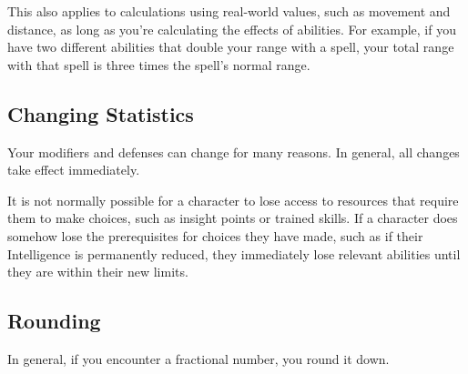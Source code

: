         This also applies to calculations using real-world values, such as movement and distance, as long as you're calculating the effects of abilities.
        For example, if you have two different abilities that double your range with a spell, your total range with that spell is three times the spell's normal range.

    \subsection{Changing Statistics}

        Your modifiers and defenses can change for many reasons.
        In general, all changes take effect immediately.

        It is not normally possible for a character to lose access to resources that require them to make choices, such as insight points or trained skills.
        If a character does somehow lose the prerequisites for choices they have made, such as if their Intelligence is permanently reduced, they immediately lose relevant abilities until they are within their new limits.

    \subsection{Rounding}
        In general, if you encounter a fractional number, you round it down.
